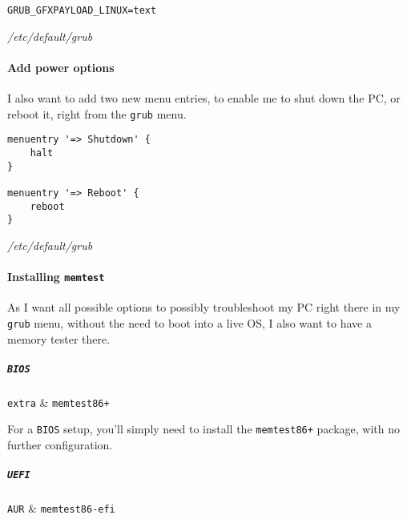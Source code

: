 \documentclass[10pt]{dustdoc}
\begin{document}
\begin{mintedlisting}
    \begin{verbatim}
GRUB_GFXPAYLOAD_LINUX=text
    \end{verbatim}

    \caption{\textit{/etc/default/grub}}
\end{mintedlisting}

\paragraph{Add power options}
\label{par:add-power-options}

I also want to add two new menu entries, to enable me to shut down the PC, or reboot it, right from the \texttt{grub} menu.

\begin{mintedlisting}
    \begin{verbatim}
menuentry '=> Shutdown' {
    halt
}

menuentry '=> Reboot' {
    reboot
}
    \end{verbatim}

    \caption{\textit{/etc/default/grub}}
\end{mintedlisting}

\paragraph{Installing \texttt{memtest}}
\label{par:installing-memtest}

As I want all possible options to possibly troubleshoot my PC right there in my \texttt{grub} menu,  without the need to boot into a live OS, I also want to have a memory tester there.

\subparagraph{\texttt{BIOS}}
\label{par:installing-memtest-bios}

\begin{packagetable}
    \texttt{extra} & \texttt{memtest86+} \\
\end{packagetable}

For a \texttt{BIOS} setup, you’ll simply need to install the \texttt{memtest86+} package, with no further configuration.

\subparagraph{\texttt{UEFI}}
\label{par:installing-memtest-uefi}

\begin{packagetable}
    \texttt{AUR} & \texttt{memtest86-efi} \\
\end{packagetable}
\end{document}
